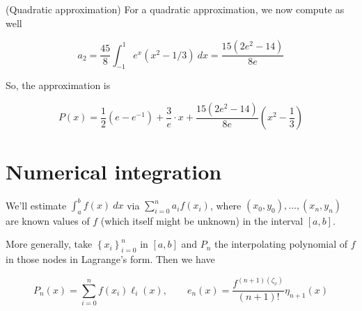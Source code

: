 \documentclass[12pt]{article}
\theoremstyle{definition}
\begin{document}
(Quadratic approximation) For a quadratic approximation, we now compute as well 

\begin{equation*}
    a_2 = \frac{45}{8} \int_{-1}^1 e^x(x^2 - 1 / 3) ~ dx = \frac{15(2e^2 - 14)}{8e}
\end{equation*}

So, the approximation is


\begin{equation*}
P(x) = \frac{1}{2}(e - e^{-1}) + \frac{3}{e} \cdot x + \frac{15(2e^2 -
14)}{8e}\left( x^2 - \frac{1}{3} \right) 
\end{equation*}


\begin{center}
\end{center}










\pagebreak 

\section{Numerical integration}

We'll estimate $\int_a^b f(x) ~ dx$ via $\sum_{i=0}^n a_i f(x_i)$, where 
$(x_0, y_0), \ldots, (x_n, y_n)$ are known values of $f$ (which itself might be
unknown) in the interval $[a, b]$. 

More generally, take $\left\{ x_i \right\}_{i=0}^n $ in $[a, b]$ and $P_n$ the
interpolating polynomial of $f$ in those nodes in Lagrange's form. Then we have 

\begin{equation*}
    P_n(x) = \sum_{i=0}^n f(x_i) \ell_i(x), \qquad e_n(x) =
    \frac{f^{(n+1)(\zeta_x)}}{(n+1)!} \eta_{n+1}(x)
\end{equation*}
\end{document}
